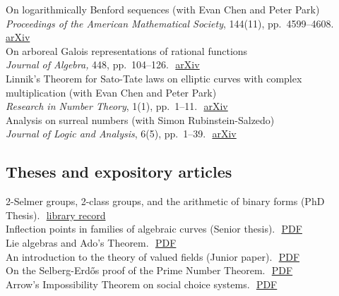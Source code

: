 \documentclass[11pt]{article} %
\begin{document}
 {On logarithmically Benford sequences} (with Evan Chen and Peter Park) \\  {\it Proceedings of the American Mathematical Society}, {144}(11), pp.~4599--4608.\,\, \textcolor[rgb]{0,0,1}{\href{https://arxiv.org/pdf/1507.02629}{arXiv}} \\
 {On arboreal Galois representations of rational functions}\\
{\it Journal of Algebra,} {448}, pp.~104--126.\,\, \textcolor[rgb]{0,0,1}{\href{https://arxiv.org/pdf/1407.7012}{arXiv}} \\
 {Linnik's Theorem for Sato-Tate laws on elliptic curves with complex multiplication} (with Evan Chen and Peter  Park) \\ 
{\it Research in Number Theory}, {1}(1), pp.~1--11.\,\, \textcolor[rgb]{0,0,1}{\href{https://arxiv.org/pdf/1506.09170}{arXiv}} \\
 {Analysis on surreal numbers} (with Simon Rubinstein-Salzedo) \\
{\it Journal of Logic and Analysis}, {6}(5), pp.~1--39.\,\, \textcolor[rgb]{0,0,1}{\href{https://arxiv.org/pdf/1307.7392}{arXiv}}

\subsection*{Theses and expository articles}

 2-Selmer groups, 2-class groups, and the arithmetic of binary forms (PhD Thesis).\,\, \textcolor[rgb]{0,0,1}{\href{https://catalog.princeton.edu/catalog/99130050799806421}{library record}} \\
 Inflection points in families of algebraic curves (Senior thesis).\,\, \textcolor[rgb]{0,0,1}{\href{http://www.math.harvard.edu/media/swaminathan.pdf}{PDF}} \\
 Lie algebras and Ado's Theorem.\,\, \textcolor[rgb]{0,0,1}{\href{https://ashvin-swaminathan.github.io/home/files/ado.pdf}{PDF}} \\
 An introduction to the theory of valued fields (Junior paper).\,\, \textcolor[rgb]{0,0,1}{\href{https://ashvin-swaminathan.github.io/home/files/ashvinswaminathan-juniorpaper.pdf}{PDF}} \\
 On the Selberg-Erd\H{o}s proof of the Prime Number Theorem.\,\, \textcolor[rgb]{0,0,1}{\href{https://ashvin-swaminathan.github.io/home/files/math229xfinalproject.pdf}{PDF}} \\
 Arrow's Impossibility Theorem on social choice systems.\,\, \textcolor[rgb]{0,0,1}{\href{https://ashvin-swaminathan.github.io/home/files/arrow-theorem.pdf}{PDF}}
\end{document}
